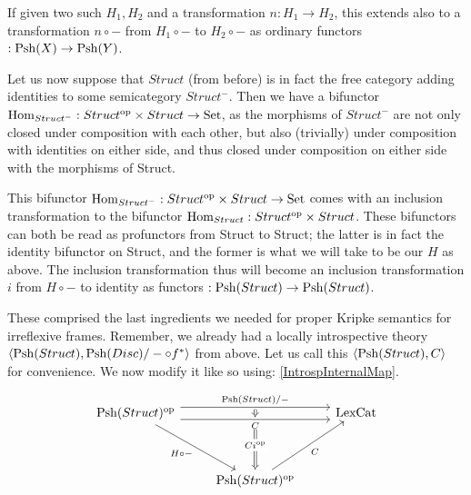 
If given two such $H_1, H_2$ and a transformation $n : H_1 \to H_2$, this extends also to a transformation $n \circ -$ from $H_1 \circ -$ to $H_2 \circ -$ as ordinary functors $: \operatorname{Psh}(X) \to \operatorname{Psh}(Y)$.

Let us now suppose that $Struct$ (from before) is in fact the free category adding identities to some semicategory $Struct^-$. Then we have a bifunctor $\operatorname{Hom}_{Struct^-} : Struct^{\mathrm{op}} \times Struct \to \mathrm{Set}$, as the morphisms of $Struct^-$ are not only closed under composition with each other, but also (trivially) under composition with identities on either side, and thus closed under composition on either side with the morphisms of Struct. 

This bifunctor $\operatorname{Hom}_{Struct^-} : Struct^{\mathrm{op}} \times Struct \to \mathrm{Set}$ comes with an inclusion transformation to the bifunctor $\operatorname{Hom}_{Struct} : Struct^{\mathrm{op}} \times Struct$. These bifunctors can both be read as profunctors from Struct to Struct; the latter is in fact the identity bifunctor on Struct, and the former is what we will take to be our $H$ as above. The inclusion transformation thus will become an inclusion transformation $i$ from $H \circ -$ to identity as functors $: \operatorname{Psh}(Struct) \to \operatorname{Psh}(Struct)$.

These comprised the last ingredients we needed for proper Kripke semantics for irreflexive frames. Remember, we already had a locally introspective theory $\langle \operatorname{Psh}(Struct), \operatorname{Psh}(Disc)/- \circ f^*\rangle$ from above. Let us call this $\langle \operatorname{Psh}(Struct), C \rangle$ for convenience. We now modify it like so using: \cref{IntrospInternalMap}.

\[\begin{tikzcd}
	{\op{\Psh{Struct}}} && \LexCat \\
	\\
	& {\op{\Psh{Struct}}}
	\arrow[""{name=0, anchor=center, inner sep=0}, "{\Psh{Struct}/-}", shift left=2, from=1-1, to=1-3]
	\arrow[""{name=1, anchor=center, inner sep=0}, "C"', shift right=2, from=1-1, to=1-3]
	\arrow["{H \circ -}"', from=1-1, to=3-2]
	\arrow["C"', from=3-2, to=1-3]
	\arrow[shorten <=1pt, shorten >=1pt, Rightarrow, from=0, to=1]
	\arrow["{C \op{i}}"{description}, shorten <=7pt, Rightarrow, from=1, to=3-2]
\end{tikzcd}\]

